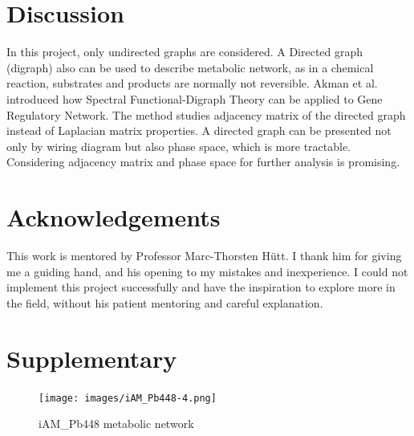 \documentclass{article} %
\begin{document}
\section{Discussion} \label{section:discussion}
In this project, only undirected graphs are considered. A Directed graph (digraph) also can be used to describe metabolic network, as in a chemical reaction, substrates and products are normally not reversible. Akman et al. introduced how Spectral Functional-Digraph Theory can be applied to Gene Regulatory Network. \cite{akman_spectral_2018} The method studies adjacency matrix of the directed graph instead of Laplacian matrix properties. A directed graph can be presented not only by wiring diagram but also phase space, which is more tractable. Considering adjacency matrix and phase space for further analysis is promising.

\section*{Acknowledgements}
This work is mentored by Professor Marc-Thorsten Hütt. I thank him for giving me a guiding hand, and his opening to my mistakes and inexperience. I could not implement this project successfully and have the inspiration to explore more in the field, without his patient mentoring and careful explanation.

\section{Supplementary}

\begin{figure}[H]
      \graphicspath{ {images/} }
      \begin{center}
            \texttt{[image: images/iAM\_Pb448-4.png]}
      \end{center}
      \caption{iAM\_Pb448 metabolic network}\label{fig:iAM_Pb448-4}
\end{figure}
\end{document}
